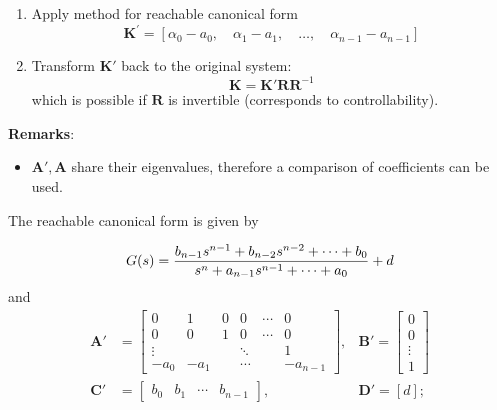 \begin{enumerate}
    \item Apply method for reachable canonical form
          \begin{equation*}
              \mathbf{K}^{\prime} =\left[\alpha_{0}-a_{0},\quad\alpha_{1}-a_{1},\quad\ldots,\quad\alpha_{n-1}-a_{n-1}\right]
          \end{equation*}
    \item Transform $\mathbf{K}'$ back to the original system:
          \noindent\begin{equation*}
              \mathbf{K}          = \mathbf{K'RR}^{-1}
          \end{equation*}
          which is possible if $\mathbf{R}$ is invertible (corresponds to controllability).
\end{enumerate}

\textbf{Remarks}:
\begin{itemize}
    \item $\mathbf{A'},\mathbf{A}$ share their eigenvalues, therefore a comparison of coefficients can be used.
\end{itemize}

\newpar{}
\label{RCF}

The reachable canonical form is given by

\begin{equation*}
    G(s)=\frac{b_{n-1}s^{n-1}+b_{n-2}s^{n-2}+\cdots+b_0}{s^n+a_{n-1}s^{n-1}+\cdots+a_0}+d\\
\end{equation*}
and
\begin{align*}
    \mathbf{A}' & =\begin{bmatrix}
                       0      & 1    & 0 & 0      & \cdots & 0        \\
                       0      & 0    & 1 & 0      & \cdots & 0        \\
                       \vdots &      &   & \ddots &        & 1        \\
                       -a_0   & -a_1 &   & \cdots &        & -a_{n-1}
                   \end{bmatrix}, & \mathbf{B}' =\begin{bmatrix}
                                                     0      \\
                                                     0      \\
                                                     \vdots \\
                                                     1\end{bmatrix}                             \\
    \mathbf{C}' & =\begin{bmatrix}
                       b_0 & b_1 & \cdots & b_{n-1}
                   \end{bmatrix},                     & \mathbf{D}'                     =[d];
\end{align*}


